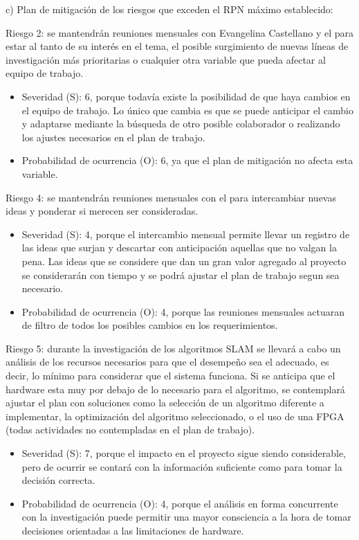 \documentclass[
11pt, %
codirector, %
]{charter}
\begin{document}
c) Plan de mitigación de los riesgos que exceden el RPN máximo establecido:

Riesgo 2: se mantendrán reuniones mensuales con Evangelina Castellano y el \clientename{} para estar al tanto de su interés en el tema, el posible surgimiento de nuevas líneas de investigación más prioritarias o cualquier otra variable que pueda afectar al equipo de trabajo.
\begin{itemize}
	\item Severidad (S): 6, porque todavía existe la posibilidad de que haya cambios en el equipo de trabajo. Lo único que cambia es que se puede anticipar el cambio y adaptarse mediante la búsqueda de otro posible colaborador o realizando los ajustes necesarios en el plan de trabajo.
	\item Probabilidad de ocurrencia (O): 6, ya que el plan de mitigación no afecta esta variable.
\end{itemize}

Riesgo 4: se mantendrán reuniones mensuales con el \clientename{} para intercambiar nuevas ideas y ponderar si merecen ser consideradas.
\begin{itemize}
	\item Severidad (S): 4, porque el intercambio mensual permite llevar un registro de las ideas que surjan y descartar con anticipación aquellas que no valgan la pena. Las ideas que se considere que dan un gran valor agregado al proyecto se considerarán con tiempo y se podrá ajustar el plan de trabajo segun sea necesario.
	\item Probabilidad de ocurrencia (O): 4, porque las reuniones mensuales actuaran de filtro de todos los posibles cambios en los requerimientos.
\end{itemize}

Riesgo 5: durante la investigación de los algoritmos SLAM se llevará a cabo un análisis de los recursos necesarios para que el desempeño sea el adecuado, es decir, lo mínimo para considerar que el sistema funciona. Si se anticipa que el hardware esta muy por debajo de lo necesario para el algoritmo, se contemplará ajustar el plan con soluciones como la selección de un algoritmo diferente a implementar, la optimización del algoritmo seleccionado, o el uso de una FPGA (todas actividades no contempladas en el plan de trabajo).
\begin{itemize}
	\item Severidad (S): 7, porque el impacto en el proyecto sigue siendo considerable, pero de ocurrir se contará con la información suficiente como para tomar la decisión correcta.
	\item Probabilidad de ocurrencia (O): 4, porque el análisis en forma concurrente con la investigación puede permitir una mayor consciencia a la hora de tomar decisiones orientadas a las limitaciones de hardware.
\end{itemize}
\end{document}
